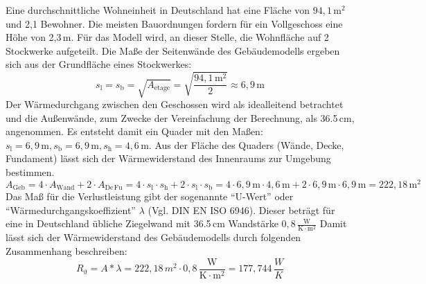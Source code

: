 Eine durchschnittliche Wohneinheit in Deutschland hat eine Fläche von \(\mathrm{94,1\,m^2}\) und 2,1 Bewohner.\cite{Webp:DestatisWohnungsflaeche}
Die meisten Bauordnungen fordern für ein Vollgeschoss eine Höhe von 2,3\,m\cite{Webp:stmb-vollgeschoss}.
Für das Modell wird, an dieser Stelle, die Wohnfläche auf 2 Stockwerke aufgeteilt.
Die Maße der Seitenwände des Gebäudemodells ergeben sich aus der Grundfläche eines Stockwerkes:
\[s_\mathrm{l} = s_\mathrm{b} = \sqrt{A_\mathrm{etage}} = \sqrt{\mathrm{\frac{94,1\,m^2}{2}}} \mathrm{\approx 6,9\,m}\]
Der Wärmedurchgang zwischen den Geschossen wird als idealleitend betrachtet und 
die Außenwände, zum Zwecke der Vereinfachung der Berechnung, als 36.5\,cm, angenommen.
Es entsteht damit ein Quader mit den Maßen: \(s_\mathrm{l} = \mathrm{6,9\,m},s_\mathrm{b} = \mathrm{6,9\,m},s_\mathrm{h} = \mathrm{4,6\,m}\).
Aus der Fläche des Quaders (Wände, Decke, Fundament) lässt sich der Wärmewiderstand des Innenraums zur Umgebung bestimmen.
\[A_\mathrm{Geb} = 4\cdot A_\mathrm{Wand} + 2\cdot A_\mathrm{De\,Fu} = 4\cdot s_\mathrm{l} \cdot s_\mathrm{h} + 2\cdot s_\mathrm{l} \cdot s_\mathrm{b} \mathrm{= 4 \cdot 6,9\,m \cdot 4,6\,m + 2 \cdot 6,9\,m \cdot6,9\,m = 222,18\,m^2}\]
Das Maß für die Verlustleistung gibt der sogenannte ``U-Wert'' oder ``Wärmedurchgangskoeffizient'' \(\lambda\) (Vgl. DIN EN ISO 6946).
Dieser beträgt für eine in Deutschland übliche Ziegelwand mit 36.5\,cm Wandstärke \(\mathrm{0,8\,\frac{W}{K\cdot m^2}}\)
Damit lässt sich der Wärmewiderstand des Gebäudemodells durch folgenden Zusammenhang beschreiben:
\[R_\mathrm{\vartheta} = A * \lambda = 222,18\,m^2 \cdot \mathrm{0,8\,\frac{W}{K\cdot m^2}} = 177,744\,\frac{W}{K}\]

